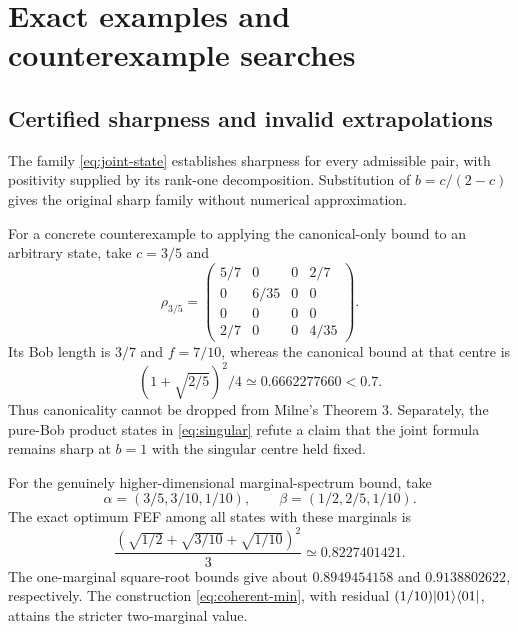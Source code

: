 \section{Exact examples and counterexample searches}\label{sec:checks}
\subsection{Certified sharpness and invalid extrapolations}
The family \eqref{eq:joint-state} establishes sharpness for every admissible pair, with positivity supplied by its rank-one decomposition. Substitution of $b=c/(2-c)$ gives the original sharp family without numerical approximation.

For a concrete counterexample to applying the canonical-only bound to an arbitrary state, take $c=3/5$ and
\[
 \rho_{3/5}=\begin{pmatrix}
 5/7&0&0&2/7\\0&6/35&0&0\\0&0&0&0\\2/7&0&0&4/35
 \end{pmatrix}.
\]
Its Bob length is $3/7$ and $f=7/10$, whereas the canonical bound at that centre is
\[
 (1+\sqrt{2/5})^2/4\simeq0.6662277660<0.7.
\]
Thus canonicality cannot be dropped from Milne's Theorem 3. Separately, the pure-Bob product states in \eqref{eq:singular} refute a claim that the joint formula remains sharp at $b=1$ with the singular centre held fixed.

For the genuinely higher-dimensional marginal-spectrum bound, take
\[
 \alpha=(3/5,3/10,1/10),\qquad\beta=(1/2,2/5,1/10).
\]
The exact optimum FEF among all states with these marginals is
\[
 \frac{(\sqrt{1/2}+\sqrt{3/10}+\sqrt{1/10})^2}{3}
 \simeq0.8227401421.
\]
The one-marginal square-root bounds give about $0.8949454158$ and $0.9138802622$, respectively. The construction \eqref{eq:coherent-min}, with residual $(1/10)\lvert 01\rangle\langle 01\rvert$, attains the stricter two-marginal value.


